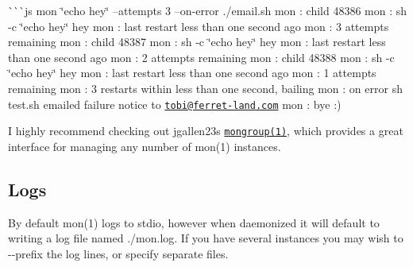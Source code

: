 \`{}\`{}\`{}js mon \char`\"{}echo hey\char`\"{} --attempts 3 --on-\/error ./email.sh mon \+: child 48386 mon \+: sh -\/c \char`\"{}echo hey\char`\"{} hey mon \+: last restart less than one second ago mon \+: 3 attempts remaining mon \+: child 48387 mon \+: sh -\/c \char`\"{}echo hey\char`\"{} hey mon \+: last restart less than one second ago mon \+: 2 attempts remaining mon \+: child 48388 mon \+: sh -\/c \char`\"{}echo hey\char`\"{} hey mon \+: last restart less than one second ago mon \+: 1 attempts remaining mon \+: 3 restarts within less than one second, bailing mon \+: on error {\ttfamily sh test.\+sh} emailed failure notice to \href{mailto:tobi@ferret-land.com}{\tt tobi@ferret-\/land.\+com} mon \+: bye \+:) 


I highly recommend checking out jgallen23\textquotesingle{}s \href{https://github.com/jgallen23/mongroup}{\tt mongroup(1)}, which provides a great interface for managing any number of {\ttfamily mon(1)} instances.

\subsection*{Logs}

By default {\ttfamily mon(1)} logs to stdio, however when daemonized it will default to writing a log file named {\ttfamily ./mon.log}. If you have several instances you may wish to {\ttfamily -\/-\/prefix} the log lines, or specify separate files.

